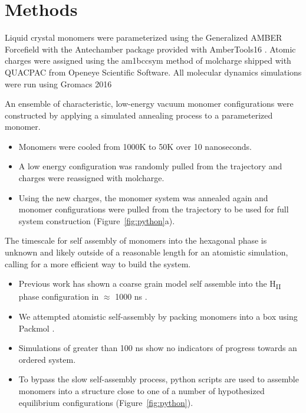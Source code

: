 \documentclass{article}
\begin{document}
  \section*{Methods}
  
  Liquid crystal monomers were parameterized using the Generalized AMBER Forcefield
  \cite{wang_development_2004} with the Antechamber package \cite{wang_automatic_2006}
  provided with AmberTools16 \cite{case_ambertools16_2016}. Atomic charges were
  assigned using the am1bccsym method of molcharge shipped with QUACPAC from Openeye %
  Scientific Software. All molecular dynamics simulations were run using Gromacs 2016  %
  \cite{bekker_gromacs:_1993,berendsen_gromacs:_1995,van_der_spoel_gromacs:_2005,hess_gromacs_2008}
  
  An ensemble of characteristic, low-energy vacuum monomer configurations
  were constructed by applying a simulated annealing process to a
  parameterized monomer.
  \begin{itemize}
    \item Monomers were cooled from 1000K to 50K over 10 nanoseconds.
    \item A low energy configuration was randomly pulled from the trajectory
    and charges were reassigned with molcharge. 
    \item Using the new charges, the monomer system was annealed again and monomer
    configurations were pulled from the trajectory to be used for full
    system construction (Figure~\ref{fig:python}a).
  \end{itemize}
  
  The timescale for self assembly of monomers into the hexagonal phase is
  unknown and likely outside of a reasonable length for an atomistic
  simulation, calling for a more efficient way to build the system. 
  \begin{itemize}
    \item Previous work has shown a coarse grain model self assemble into
    the H\textsubscript{II} phase configuration in $\approx$ 1000 ns \cite{mondal_self-assembly_2013}.
    \item We attempted atomistic self-assembly by packing monomers into a box 
    using Packmol \cite{martinez_packmol:_2009}.
    \item Simulations of greater than 100 ns show no indicators of progress 
    towards an ordered system.  %
    \item To bypass the slow self-assembly process, python scripts are used
    to assemble monomers into a structure close to one of a number of 
    hypothesized equilibrium configurations (Figure~\ref{fig:python}).
  \end{itemize}
\end{document}
